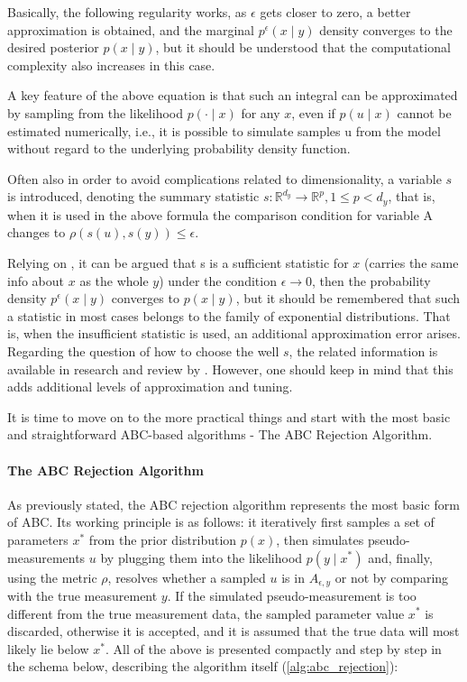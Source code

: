 Basically, the following regularity works, as \(\epsilon\) gets closer to zero, a better approximation is obtained, and the marginal \(p^\epsilon \left(x \mid y\right)\) density converges to the desired posterior \(p\left(x \mid y \right)\), but it should be understood that the computational complexity also increases in this case.

A key feature of the above equation is that such an integral can be approximated by sampling from the likelihood \(p\left(\cdot \mid x\right)\) for any \(x\), even if \(p\left(u \mid x\right)\) cannot be estimated numerically, i.e., it is possible to simulate samples u from the model without regard to the underlying probability density function.

Often also in order to avoid complications related to dimensionality, a variable \(s\) is introduced, denoting the summary statistic \(s:\mathbb{R}^{d_y} \rightarrow \mathbb{R}^{p},  1 \leqslant p < d_y\), that is, when it is used in the above formula the comparison condition for variable A changes to \(\rho(s(u), s(y)) \leq \epsilon\).

Relying on \cite{jasra_filtering_2012}, it can be argued that s is a sufficient statistic for \(x\) (carries the same info about \(x\) as the whole \(y\)) under the condition \(\epsilon \rightarrow 0\), then the probability density \(p^\epsilon \left(x \mid y\right)\) converges to \(p\left(x \mid y \right)\), but it should be remembered that such a statistic in most cases belongs to the family of exponential distributions. That is, when the insufficient statistic is used, an additional approximation error arises. Regarding the question of how to choose the well \(s\), the related information is available in research \cite{fearnhead_constructing_2012} and review by \cite{blum_blum_2012}. However, one should keep in mind that this adds additional levels of approximation and tuning.

It is time to move on to the more practical things and start with the most basic and straightforward ABC-based algorithms - The ABC Rejection Algorithm.

\paragraph*{The ABC Rejection Algorithm}
As previously stated, the ABC rejection algorithm represents the most basic form of ABC. Its working principle is as follows: it iteratively first samples a set of parameters \(x^{*}\) from the prior distribution \(p(x)\), then simulates pseudo-measurements \(u\) by plugging them into the likelihood \(p\left(y \mid x^{*}\right)\) and, finally, using the metric \(\rho\), resolves whether a sampled \(u\) is in \(A_{\epsilon, y}\) or not by comparing with the true measurement \(y\). If the simulated pseudo-measurement is too different from the true measurement data, the sampled parameter value \(x^{*}\) is discarded, otherwise it is accepted, and it is assumed that the true data will most likely lie below \(x^{*}\). All of the above is presented compactly and step by step in the schema below, describing the algorithm itself (\ref{alg:abc_rejection}):

